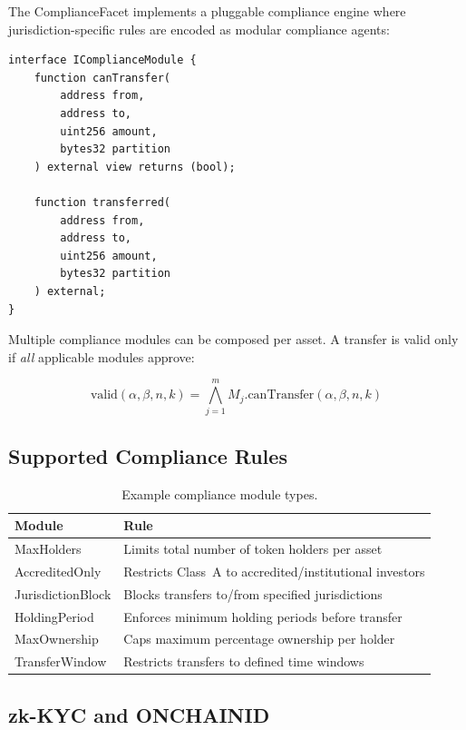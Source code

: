\documentclass[11pt,a4paper]{article}
\begin{document}
The ComplianceFacet implements a pluggable compliance engine where jurisdiction-specific rules are encoded as modular compliance agents:

\begin{lstlisting}[caption={Compliance module interface}]
interface IComplianceModule {
    function canTransfer(
        address from,
        address to,
        uint256 amount,
        bytes32 partition
    ) external view returns (bool);

    function transferred(
        address from,
        address to,
        uint256 amount,
        bytes32 partition
    ) external;
}
\end{lstlisting}

Multiple compliance modules can be composed per asset. A transfer is valid only if \textit{all} applicable modules approve:

\begin{equation}
    \text{valid}(\alpha, \beta, n, k) = \bigwedge_{j=1}^{m} M_j.\text{canTransfer}(\alpha, \beta, n, k)
\end{equation}

\subsection{Supported Compliance Rules}

\begin{table}[H]
\centering
\caption{Example compliance module types.}
\begin{tabularx}{\textwidth}{lX}
\toprule
\textbf{Module} & \textbf{Rule} \\
\midrule
MaxHolders & Limits total number of token holders per asset \\
AccreditedOnly & Restricts Class~A to accredited/institutional investors \\
JurisdictionBlock & Blocks transfers to/from specified jurisdictions \\
HoldingPeriod & Enforces minimum holding periods before transfer \\
MaxOwnership & Caps maximum percentage ownership per holder \\
TransferWindow & Restricts transfers to defined time windows \\
\bottomrule
\end{tabularx}
\end{table}

\subsection{zk-KYC and ONCHAINID}
\end{document}
